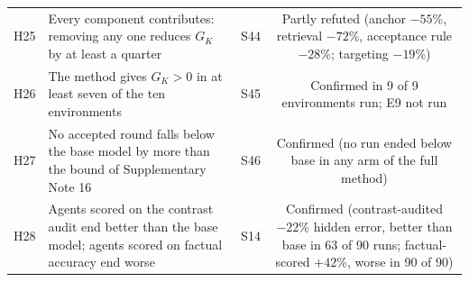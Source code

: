 \documentclass[11pt,a4paper]{article}
\begin{document}
\begin{table}[!htbp]
\begin{tabularx}{\textwidth}{@{}c Y c c@{}}
H25 & Every component contributes: removing any one reduces $G_K$ by at least a quarter & S44 & Partly refuted (anchor $-55$\%, retrieval $-72$\%, acceptance rule $-28$\%; targeting $-19$\%)\\
H26 & The method gives $G_K>0$ in at least seven of the ten environments & S45 & Confirmed in 9 of 9 environments run; E9 not run\\
H27 & No accepted round falls below the base model by more than the bound of Supplementary Note 16 & S46 & Confirmed (no run ended below base in any arm of the full method)\\
H28 & Agents scored on the contrast audit end better than the base model; agents scored on factual accuracy end worse & S14 & Confirmed (contrast-audited $-22$\% hidden error, better than base in 63 of 90 runs; factual-scored $+42$\%, worse in 90 of 90)\\
\bottomrule\end{tabularx}
\end{table}
\FloatBarrier
\end{document}
